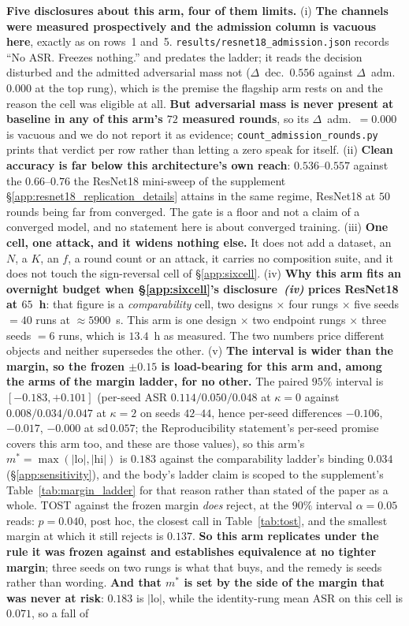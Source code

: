 \documentclass{article}
\begin{document}
\textbf{Five disclosures about this arm, four of them limits.} (i) \textbf{The channels were measured prospectively and the admission column is vacuous here}, exactly as on rows~1 and~5. \texttt{results/\allowbreak resnet18\_\allowbreak admission.json} records ``No ASR. Freezes nothing.'' and predates the ladder; it reads the decision disturbed and the admitted adversarial mass not ($\Delta$~dec.\ $0.556$ against $\Delta$~adm.\ $0.000$ at the top rung), which is the premise the flagship arm rests on and the reason the cell was eligible at all. \textbf{But adversarial mass is never present at baseline in any of this arm's $72$ measured rounds}, so its $\Delta$~adm.\ $=0.000$ is vacuous and we do not report it as evidence; \texttt{count\_admission\_rounds.py} prints that verdict per row rather than letting a zero speak for itself. (ii) \textbf{Clean accuracy is far below this architecture's own reach}: $0.536$--$0.557$ against the $0.66$--$0.76$ the ResNet18 mini-sweep of the supplement §\ref{app:resnet18_replication_details} attains in the same regime, ResNet18 at $50$ rounds being far from converged. The gate is a floor and not a claim of a converged model, and no statement here is about converged training. (iii) \textbf{One cell, one attack, and it widens nothing else.} It does not add a dataset, an $N$, a $K$, an $f$, a round count or an attack, it carries no composition suite, and it does not touch the sign-reversal cell of §\ref{app:sixcell}. (iv) \textbf{Why this arm fits an overnight budget when §\ref{app:sixcell}'s disclosure~\emph{(iv)} prices ResNet18 at $65$~h}: that figure is a \emph{comparability} cell, two designs $\times$ four rungs $\times$ five seeds $=40$ runs at ${\approx}5900$~s. This arm is one design $\times$ two endpoint rungs $\times$ three seeds $=6$ runs, which is $13.4$~h as measured. The two numbers price different objects and neither supersedes the other. (v) \textbf{The interval is wider than the margin, so the frozen $\pm0.15$ is load-bearing for this arm and, among the arms of the margin ladder, for no other.} The paired $95\%$ interval is $[-0.183,+0.101]$ (per-seed ASR $0.114/0.050/0.048$ at $\kappa{=}0$ against $0.008/0.034/0.047$ at $\kappa{=}2$ on seeds $42$--$44$, hence per-seed differences $-0.106$, $-0.017$, $-0.000$ at $\mathrm{sd}\,0.057$; the Reproducibility statement's per-seed promise covers this arm too, and these are those values), so this arm's $m^{\ast} = \max(|\mathrm{lo}|,|\mathrm{hi}|)$ is $0.183$ against the comparability ladder's binding $0.034$ (§\ref{app:sensitivity}), and the body's ladder claim is scoped to the supplement's Table~\ref{tab:margin_ladder} for that reason rather than stated of the paper as a whole. TOST against the frozen margin \emph{does} reject, at the $90\%$ interval $\alpha{=}0.05$ reads: $p{=}0.040$, post hoc, the closest call in Table~\ref{tab:tost}, and the smallest margin at which it still rejects is $0.137$. \textbf{So this arm replicates under the rule it was frozen against and establishes equivalence at no tighter margin}; three seeds on two rungs is what that buys, and the remedy is seeds rather than wording. \textbf{And that $m^{\ast}$ is set by the side of the margin that was never at risk}: $0.183$ is $|\mathrm{lo}|$, while the identity-rung mean ASR on this cell is $0.071$, so a fall of 
\end{document}
